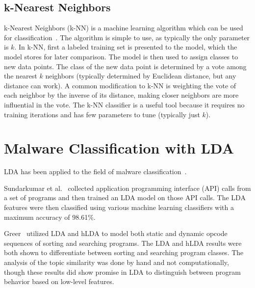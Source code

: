 \documentclass[../stegner_thesis.tex]{subfiles}
\begin{document}
\subsection{k-Nearest Neighbors}%
\label{subsec:bg_knn}

\par k-Nearest Neighbors (k-NN) is a machine learning algorithm which can be
used for classification~\cite{hastieElementsStatistical}.
The algorithm is simple to use, as typically the only parameter is $k$.
In k-NN, first a labeled training set is presented to the model, which the
model stores for later comparison.
The model is then used to assign classes to new data points.
The class of the new data point is determined by a vote among the nearest $k$
neighbors (typically determined by Euclidean distance, but any distance can
work).
A common modification to k-NN is weighting the vote of each neighbor by the
inverse of its distance, making closer neighbors are more influential in the
vote.
The k-NN classifier is a useful tool because it requires no training iterations
and has few parameters to tune (typically just $k$).

\section{Malware Classification with LDA}%
\label{sec:bg_malware_class}

\par LDA has been applied to the field of malware classification~\cite{%
	sundarkumarMalwareDetection2015,
	greerUnsupervisedInterpretable2019,
	djaneye-boundjouStaticAnalysis2019a,
}.

\par Sundarkumar et al.~\cite{sundarkumarMalwareDetection2015} collected
application programming interface (API) calls from a set of programs and then
trained an LDA model on those API calls.
The LDA features were then classified using various machine learning
classifiers with a maximum accuracy of 98.61\%.

\par Greer~\cite{greerUnsupervisedInterpretable2019} utilized LDA and hLDA to
model both static and dynamic opcode sequences of sorting and searching
programs.
The LDA and hLDA results were both shown to differentiate between sorting and
searching program classes.
The analysis of the topic similarity was done by hand and not computationally,
though these results did show promise in LDA to distinguish between program
behavior based on low-level features.
\end{document}
